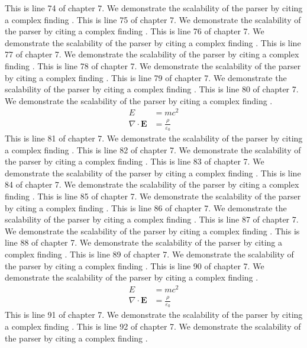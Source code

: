 This is line 74 of chapter 7. We demonstrate the scalability of the parser by citing a complex finding \cite{ref7_74}.
This is line 75 of chapter 7. We demonstrate the scalability of the parser by citing a complex finding \cite{ref7_75}.
This is line 76 of chapter 7. We demonstrate the scalability of the parser by citing a complex finding \cite{ref7_76}.
This is line 77 of chapter 7. We demonstrate the scalability of the parser by citing a complex finding \cite{ref7_77}.
This is line 78 of chapter 7. We demonstrate the scalability of the parser by citing a complex finding \cite{ref7_78}.
This is line 79 of chapter 7. We demonstrate the scalability of the parser by citing a complex finding \cite{ref7_79}.
This is line 80 of chapter 7. We demonstrate the scalability of the parser by citing a complex finding \cite{ref7_80}.
\begin{align*}
  E &= mc^2 \\
  \nabla \cdot \mathbf{E} &= \frac{\rho}{\varepsilon_0}
\end{align*}
This is line 81 of chapter 7. We demonstrate the scalability of the parser by citing a complex finding \cite{ref7_81}.
This is line 82 of chapter 7. We demonstrate the scalability of the parser by citing a complex finding \cite{ref7_82}.
This is line 83 of chapter 7. We demonstrate the scalability of the parser by citing a complex finding \cite{ref7_83}.
This is line 84 of chapter 7. We demonstrate the scalability of the parser by citing a complex finding \cite{ref7_84}.
This is line 85 of chapter 7. We demonstrate the scalability of the parser by citing a complex finding \cite{ref7_85}.
This is line 86 of chapter 7. We demonstrate the scalability of the parser by citing a complex finding \cite{ref7_86}.
This is line 87 of chapter 7. We demonstrate the scalability of the parser by citing a complex finding \cite{ref7_87}.
This is line 88 of chapter 7. We demonstrate the scalability of the parser by citing a complex finding \cite{ref7_88}.
This is line 89 of chapter 7. We demonstrate the scalability of the parser by citing a complex finding \cite{ref7_89}.
This is line 90 of chapter 7. We demonstrate the scalability of the parser by citing a complex finding \cite{ref7_90}.
\begin{align*}
  E &= mc^2 \\
  \nabla \cdot \mathbf{E} &= \frac{\rho}{\varepsilon_0}
\end{align*}
This is line 91 of chapter 7. We demonstrate the scalability of the parser by citing a complex finding \cite{ref7_91}.
This is line 92 of chapter 7. We demonstrate the scalability of the parser by citing a complex finding \cite{ref7_92}.
